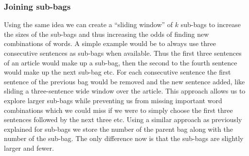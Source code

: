 \subsubsection{Joining sub-bags}
Using the same idea we can create a ``sliding window'' of $k$ sub-bags to increase the sizes of the sub-bags and thus increasing the odds of finding new combinations of words. A simple example would be to always use three consecutive sentences as sub-bags when available. Thus the first three sentences of an article would make up a sub-bag, then the second to the fourth sentence would make up the next sub-bag etc. For each consecutive sentence the first sentence of the previous bag would be removed and the new sentence added, like sliding a three-sentence wide window over the article. This approach allows us to explore larger sub-bags while preventing us from missing important word combinations which we could miss if we were to simply choose the first three sentences followed by the next three etc. Using a similar approach as previously explained for sub-bags we store the number of the parent bag along with the number of the sub-bag. The only difference now is that the sub-bags are slightly larger and fewer.
